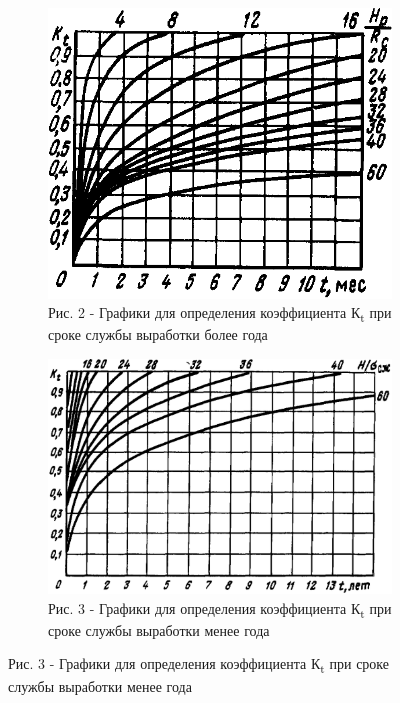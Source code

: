 \begin{figure}[H]
    \centering
    \begin{subfigure}[b]{0.4\textwidth}
        \centering
        \includegraphics[width=\textwidth]{assets/1126}
		\caption*{Рис. 2 - Графики для определения коэффициента К\textsubscript{t} при сроке службы выработки более года}
    \end{subfigure}
    \hfill
    \begin{subfigure}[b]{0.55\textwidth}
        \centering
        \includegraphics[width=\textwidth]{assets/1127}
		\caption*{Рис. 3 - Графики для определения коэффициента К\textsubscript{t} при сроке службы выработки менее года}
    \end{subfigure}
\end{figure}

